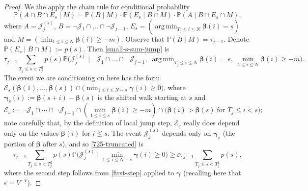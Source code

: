 \documentclass[11pt,reqno]{amsart}
\DeclareMathOperator*{\argmin}{arg\,min}
\numberwithin{equation}{section}
\theoremstyle{definition}
\theoremstyle{remark}
\newcommand{\mb}{\mathbb}
\newcommand{\eps}{\varepsilon}
\def\boldbeta{\boldsymbol\beta}
\def\boldgamma{\boldsymbol\gamma}
\renewcommand{\le}{\leqslant}
\renewcommand{\ge}{\geqslant}
\begin{document}
\begin{proof}
We the apply the chain rule for conditional probability
\[ \mb{P}(A \cap B \cap E_s \mid M) = \mb{P}(B \mid M) \cdot \mb{P}(E_s \mid B \cap M) \cdot \mb{P}(A \mid B \cap E_s \cap M),\]
where $A = \mathcal{J}^{(s)}_j$, $B = \neg \mathcal{J}_1 \cap \dots \cap \neg\mathcal{J}_{j-1}$, $E_s = (\argmin_{T_j \le i \le N} \boldbeta(i) = s)$ and $M = (\min_{1 \le i \le N} \boldbeta(i) \ge -m)$. Observe that $\mb{P}(B \mid M) = \tau_{j-1}$. Denote $\mb{P}(E_s \mid B \cap M) := p(s)$. Then \cref{small-s-sum-jump} is
\begin{equation}\label{725-truncated} \tau_{j-1}\sum_{T_j \le s < T_{j}^2} p(s)\mb{P} \big( \mathcal{J}^{(s)}_j \mid \neg \mathcal{J}_1 \cap \dots \cap \neg\mathcal{J}_{j-1} ,\; \argmin_{T_j \le i \le N} \boldbeta(i) = s ,\;  \min_{1 \le i \le N} \boldbeta(i) \ge -m \big) .\end{equation}
The event we are conditioning on here has the form $\mathcal{E}_s(\boldbeta(1),\dots, \boldbeta(s)) \cap \big( \min_{1 \le i \le N - s} \boldgamma(i) \ge 0)$, where $\boldgamma_s(i) := \boldbeta(s + i) - \boldbeta(s)$ is the shifted walk starting at $s$ and 
\[ \mathcal{E}_s := \neg \mathcal{J}_1 \cap \cdots \cap \neg \mathcal{J}_{j-1} \cap (\min_{1 \le i \le s} \boldbeta(i) \ge -m ) \cap \big( \boldbeta(i) > \boldbeta(s) \; \mbox{for $T_j \le i < s$}\big);  \] note carefully that, by the definition of local jump step, $\mathcal{E}_s$ really does depend only on the values $\boldbeta(i)$ for $i \le s$. The event $\mathcal{J}^{(s)}_j$ depends only on $\boldgamma_s$ (the portion of $\boldbeta$ after $s$), and so \cref{725-truncated} is
\[ \tau_{j-1} \sum_{T_j \le s < T_{j}^2} p(s) \mb{P} \big( \mathcal{J}^{(s)}_j \mid \min_{1 \le i \le N - s} \boldgamma(i) \ge 0\big) \ge  \eps \tau_{j-1} \sum_{T_j \le s < T_{j}^2} p(s),\]  where the second step follows from \cref{first-step} applied to $\boldgamma$ (recalling here that $\eps = V^{-V}$).


\end{proof}
\end{document}
